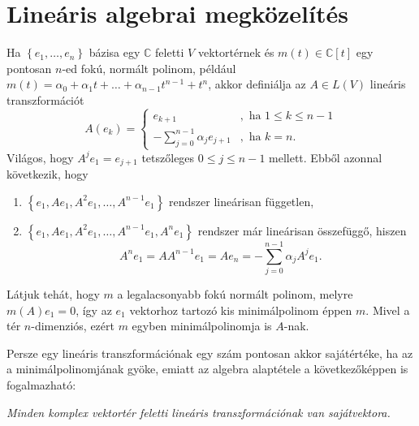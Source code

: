 \documentclass[a4paper, showtrims]{memoir}
\theoremstyle{plain}
\theoremstyle{remark}
\theoremstyle{definition}
\begin{document}
\section{Lineáris algebrai megközelítés}
Ha $\left\{ e_1,\ldots,e_n \right\}$ bázisa egy $\mathbb{C}$ feletti $V$ vektortérnek
és $m\left( t \right)\in\mathbb{C}\left[ t \right]$ egy pontosan $n$-ed fokú,
normált polinom,
például
$m\left( t \right)=\alpha_0+\alpha_1 t+\dots+\alpha_{n-1}t^{n-1}+t^{n}$,
akkor definiálja az $A\in L\left( V \right)$ lineáris transzformációt
\[
	A\left( e_k \right)=
	\begin{cases}
		e_{k+1}                           & , \text{ ha } 1\leq k \leq n-1 \\
		-\sum_{j=0}^{n-1}\alpha_j e_{j+1} & , \text{ ha } k=n.
	\end{cases}
\]
Világos, hogy $A^je_1=e_{j+1}$ tetszőleges $0\leq j\leq n-1$ mellett.
Ebből azonnal következik, hogy
\begin{enumerate}
	\item
	      $\left\{ e_1, Ae_1,A^2e_1,\ldots,A^{n-1}e_1\right\}$ rendszer lineárisan független,
	\item
	      $\left\{ e_1, Ae_1,A^2e_1,\ldots,A^{n-1}e_1,A^ne_1\right\}$ rendszer már lineárisan összefüggő,
	      hiszen
	      \[
              A^ne_1=AA^{n-1}e_1=Ae_n=-\sum_{j=0}^{n-1}\alpha_j A^je_1.
          \]
\end{enumerate}
Látjuk tehát, hogy $m$ a legalacsonyabb fokú normált polinom, melyre
$m\left( A \right)e_1=0$,
így az $e_1$ vektorhoz tartozó kis minimálpolinom éppen $m$.
Mivel a tér $n$-dimenziós, ezért $m$ egyben minimálpolinomja is $A$-nak.

Persze egy lineáris transzformációnak egy szám pontosan akkor sajátértéke,
ha az a minimálpolinomjának gyöke,
emiatt
az algebra alaptétele a következőképpen is fogalmazható:
\begin{center}
	\emph{Minden komplex vektortér feletti lineáris transzformációnak van sajátvektora.}
\end{center}
\end{document}
